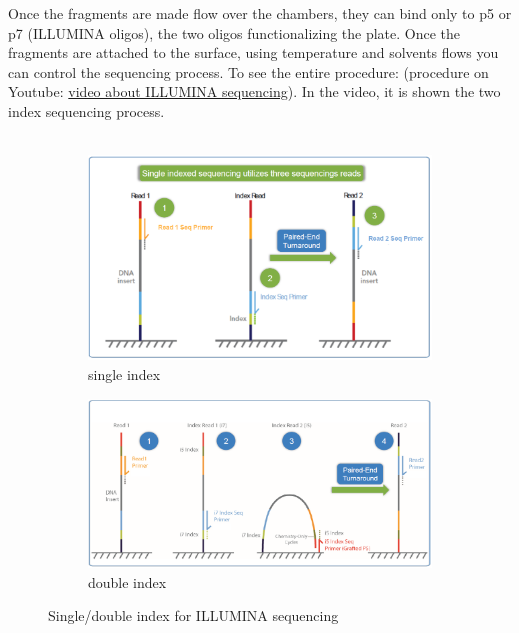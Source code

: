 Once the fragments are made flow over the chambers, they can bind only to p5 or p7 (ILLUMINA oligos), the two oligos functionalizing the plate. Once the fragments are attached to the surface, using temperature and solvents flows you can control the sequencing process. To see the entire procedure:
(procedure on Youtube: \href{https://www.youtube.com/watch?v=womKfikWlxM}{video about ILLUMINA sequencing}). In the video, it is shown the two index sequencing process.
\\
\\


\begin{figure}[H]
    \centering

    \begin{subfigure}[b]{0.39\textwidth}
        \centering
        \includegraphics[width=\textwidth]{singleIndex}
        \caption{single index}
    \end{subfigure}
    \hfill
    \begin{subfigure}[b]{0.60\textwidth}
        \centering
        \includegraphics[width=\textwidth]{doubleIndex}
        \caption{double index}
    \end{subfigure}
    \caption{Single/double index for ILLUMINA sequencing}
    \label{singDoubInd}
\end{figure}

